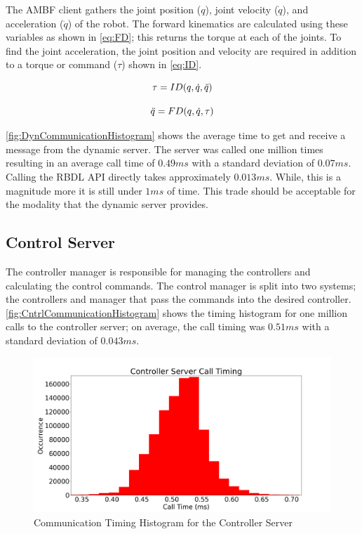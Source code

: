 The AMBF client gathers the joint position ($q$), joint velocity ($\Dot{q}$), and acceleration ($\DDot{q}$) of the robot.  The forward kinematics are calculated using these variables as shown in \autoref{eq:FD}; this returns the torque at each of the joints. To find the joint acceleration, the joint position and velocity are required in addition to a torque or command ($\tau$) shown in \autoref{eq:ID}.  

\begin{equation}
    \Large
    \tau = ID(q,\Dot{q}, \Ddot{q})
    \label{eq:ID}
\end{equation}


\begin{equation}
    \Large
    \Ddot{q} = FD(q,\Dot{q}, \tau )
    \label{eq:FD}
\end{equation}



\autoref{fig:DynCommunicationHistogram} shows the average time to get and receive a message from the dynamic server. The server was called one million times resulting in an average call time of $0.49ms$ with a standard deviation of $0.07ms$. Calling the RBDL API directly takes approximately $0.013ms$. While, this is a magnitude more it is still under $1ms$ of time. This trade should be acceptable for the modality that the dynamic server provides. 


 
 
 \subsection{Control Server}
 
 The controller manager is responsible for managing the controllers and calculating the control commands. The control manager is split into two systems; the controllers and manager that pass the commands into the desired controller. 
\autoref{fig:CntrlCommunicationHistogram} shows the timing histogram for one million calls to the controller server; on average, the call timing was $0.51ms$ with a standard deviation of $0.043ms$.  

 \begin{figure}
     \centering
     \includegraphics[scale=0.35]{images/software/control_loop_timing.png}
     \caption[Controller Server Timing Histogram]{Communication Timing Histogram for the Controller Server}
     \label{fig:CntrlCommunicationHistogram}
 \end{figure}



